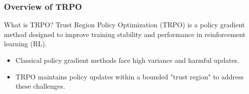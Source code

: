 \documentclass{beamer}
\begin{document}
\begin{frame}[fragile]
    \frametitle{Overview of TRPO}
    \begin{block}{What is TRPO?}
        Trust Region Policy Optimization (TRPO) is a policy gradient method designed to improve training stability and performance in reinforcement learning (RL).
    \end{block}
    \begin{itemize}
        \item Classical policy gradient methods face high variance and harmful updates.
        \item TRPO maintains policy updates within a bounded "trust region" to address these challenges.
    \end{itemize}
\end{frame}
\end{document}
